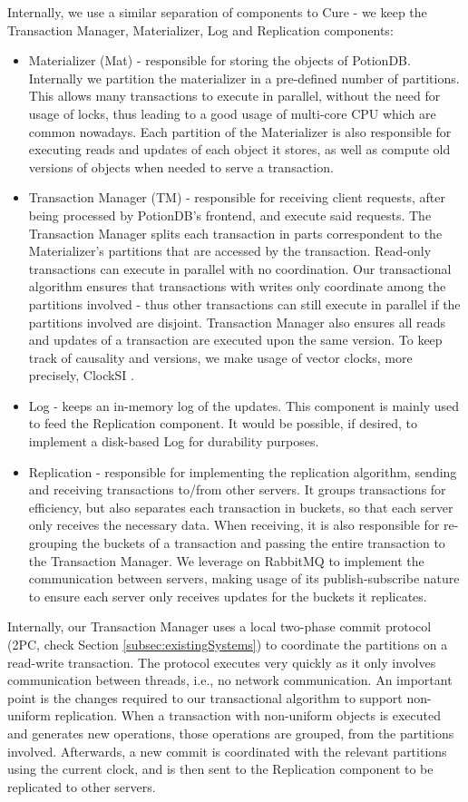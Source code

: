 Internally, we use a similar separation of components to Cure - we keep the Transaction Manager, Materializer, Log and Replication components:
\begin{itemize}
	\item Materializer (Mat) - responsible for storing the objects of PotionDB. Internally we partition the materializer in a pre-defined number of partitions.
	This allows many transactions to execute in parallel, without the need for usage of locks, thus leading to a good usage of multi-core CPU which are common nowadays.
	Each partition of the Materializer is also responsible for executing reads and updates of each object it stores, as well as compute old versions of objects when needed to serve a transaction.
	\item Transaction Manager (TM) - responsible for receiving client requests, after being processed by PotionDB's frontend, and execute said requests.
	The Transaction Manager splits each transaction in parts correspondent to the Materializer's partitions that are accessed by the transaction.
	Read-only transactions can execute in parallel with no coordination.
	Our transactional algorithm ensures that transactions with writes only coordinate among the partitions involved - thus other transactions can still execute in parallel if the partitions involved are disjoint.
	Transaction Manager also ensures all reads and updates of a transaction are executed upon the same version.
	To keep track of causality and versions, we make usage of vector clocks, more precisely, ClockSI \cite{???}.
	\item Log - keeps an in-memory log of the updates. This component is mainly used to feed the Replication component. It would be possible, if desired, to implement a disk-based Log for durability purposes.
	\item Replication - responsible for implementing the replication algorithm, sending and receiving transactions to/from other servers.
	It groups transactions for efficiency, but also separates each transaction in buckets, so that each server only receives the necessary data.
	When receiving, it is also responsible for re-grouping the buckets of a transaction and passing the entire transaction to the Transaction Manager.
	We leverage on RabbitMQ \cite{???} to implement the communication between servers, making usage of its publish-subscribe nature to ensure each server only receives updates for the buckets it replicates.
\end{itemize}

Internally, our Transaction Manager uses a local two-phase commit protocol (2PC, check Section \ref{subsec:existingSystems}) to coordinate the partitions on a read-write transaction.
The protocol executes very quickly as it only involves communication between threads, i.e., no network communication.
An important point is the changes required to our transactional algorithm to support non-uniform replication.
When a transaction with non-uniform objects is executed and generates new operations, those operations are grouped, from the partitions involved.
Afterwards, a new commit is coordinated with the relevant partitions using the current clock, and is then sent to the Replication component to be replicated to other servers.

